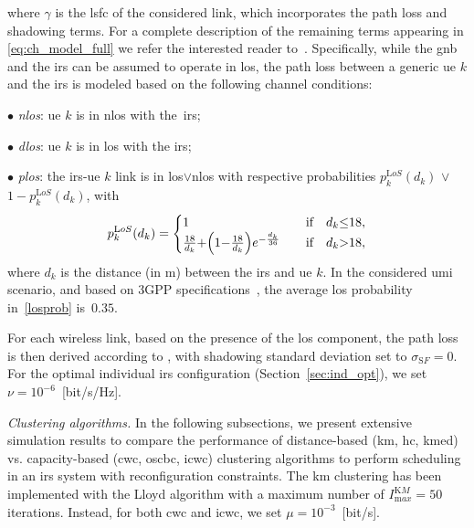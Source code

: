 where $\gamma$ is the \gls{lsfc} of the considered link, which incorporates the path loss and shadowing terms. For a complete description of the remaining terms appearing in \eqref{eq:ch_model_full} we refer the interested reader to~\cite{zugno20implementation}.
Specifically, while the \gls{gnb} and the \gls{irs} can be assumed to operate in \gls{los}, the path loss between a generic \gls{ue} $k$ and the \gls{irs} is modeled based on the following channel conditions:

\noindent $\bullet$ \emph{\gls{nlos}}: \gls{ue} $k$ is in \gls{nlos} with the~\gls{irs};

\noindent $\bullet$ \emph{\gls{dlos}}: \gls{ue} $k$ is in \gls{los} with the \gls{irs};

\noindent $\bullet$ \emph{\gls{plos}}: the \gls{irs}-\gls{ue} $k$ link is in \gls{los}$\vee$\gls{nlos} with respective probabilities $p_k^{\mathrm LoS}(d_k)$ $\vee$ $1{-}p_k^{\mathrm LoS}(d_k)$, with
\begin{equation}
\label{losprob}
p_k^{\mathrm LoS}(d_k) = 
\begin{cases}
1 \quad &\hbox{if} \quad d_k{\leq}18, \\
\frac{18}{d_k} {+} \left(1{-}\frac{18}{d_k}\right)e^{-\frac{d_k}{36}} \quad &\hbox{if} \quad d_k{>}18,
\end{cases}
\end{equation}
where $d_k$ is the distance (in m) between the \gls{irs} and \gls{ue} $k$. In the considered \gls{umi} scenario, and based on 3GPP specifications~\cite{3gpp.38.901}, the average \gls{los} probability in~\eqref{losprob} is~$0.35$.

For each wireless link, based on the presence of the \gls{los} component, the path loss is then derived according to \cite[Table 7.4.1-1]{3gpp.38.901}, with shadowing standard deviation set to $\sigma_{\mathrm SF}=0$.
For the optimal individual \gls{irs} configuration (Section~\ref{sec:ind_opt}), we set $\nu = 10^{-6}$~[bit/s/Hz].

\emph{Clustering algorithms.}
In the following subsections, we present extensive simulation results to compare the performance of distance-based (\gls{km}, \gls{hc}, \gls{kmed}) vs. capacity-based (\gls{cwc}, \gls{oscbc}, \gls{icwc}) clustering algorithms to perform scheduling in an \gls{irs} system with reconfiguration constraints.
The \gls{km} clustering has been implemented with the Lloyd algorithm \cite{Kmeans} with a maximum number of $I_{\mathrm max}^{\mathrm KM}=50$ iterations. 
Instead, for both \gls{cwc} and \gls{icwc}, we set $\mu = 10^{-3}$~[bit/s].

